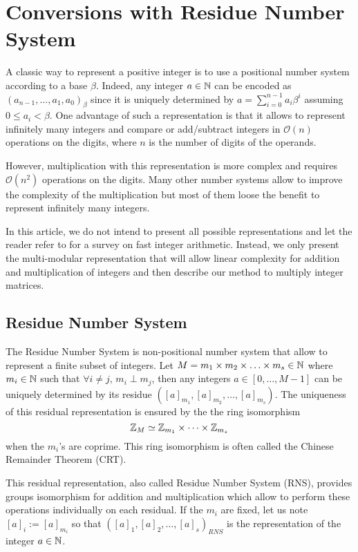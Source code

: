 \documentclass[acmtoms,acmnow]{acmtrans2m}
\def\bigO{{\ensuremath{\mathcal{O}}}}
\newcommand{\assign}{:=}
\begin{document}
\section{Conversions with Residue Number System}
\label{sec:ConvRNS}

A classic way to represent a positive integer is to use a positional number
system according to a base $\beta$.  Indeed, any integer $a\in\mathbb{N}$ can be encoded
as $(a_{n-1},\hdots,a_1,a_0)_\beta$ since it is uniquely determined by
$a=\sum_{i=0}^{n-1} a_i\beta^i$ assuming $0\leq a_i < \beta$. One advantage of
such a representation is that it allows to represent infinitely many integers
and compare or add/subtract integers in $\bigO(n)$ operations on the digits,
where $n$ is the number of digits of the operands.

However, multiplication with this representation is more complex and requires
$\bigO(n^2)$ operations on the digits. Many other number systems allow to
improve the complexity of the multiplication but most of them loose the benefit
to represent infinitely many integers.

In this article, we do not intend to present all possible representations and
let the reader refer to \cite{BrZi10,Bernstein08} for a survey on fast
integer arithmetic.  Instead, we only present the multi-modular representation
that will allow linear complexity for addition and multiplication of integers
and then describe our method to multiply integer matrices.

\subsection{Residue Number System}

The Residue Number System is non-positional number system that allow to
represent a finite subset of integers.  Let
$M=m_1\times m_2 \times \hdots \times m_s \in \mathbb{N}$ where $m_i\in\mathbb{N}$ such that
$\forall i\neq j,\, m_i\perp m_j$, then any integers $a\in [0,\hdots,M-1]$ can
be uniquely determined by its residue
$( [a]_{m_1}, [a]_{m_2}, \dots, [a]_{m_s})$. The uniqueness of this residual
representation is ensured by the the ring isomorphism
\begin{equation}\label{eq:crt} 
\mathbb{Z}_M \simeq \mathbb{Z}_{m_1}\times \dots \times \mathbb{Z}_{m_s}
\end{equation} 
when the $m_i$'s are coprime. This ring isomorphism is often
called the Chinese Remainder Theorem (CRT)\cite[Section 5.4]{GaGe03}.
 
This residual representation, also called Residue Number System (RNS), provides
groups isomorphism for addition and multiplication which allow to perform these
operations individually on each residual. If the $m_i$ are fixed, let us note
$[a]_i \assign [a]_{m_i}$ so that $([a]_1,[a]_2,\dots,[a]_s)_{RNS}$ is the
representation of the integer $a \in \mathbb{N}$.\\
\end{document}
